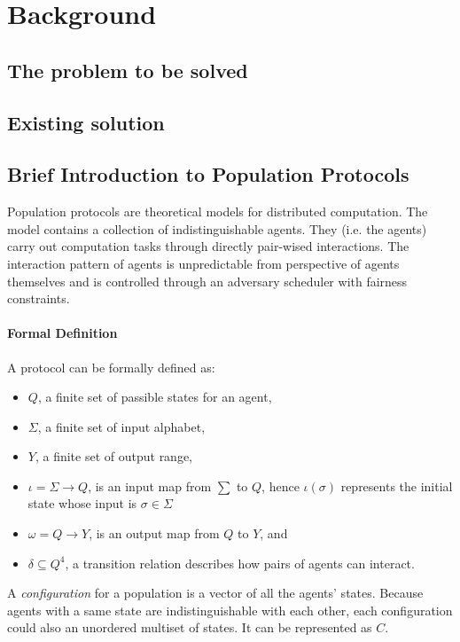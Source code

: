 \section{Background}
\subsection{The problem to be solved}

\subsection{Existing solution}

\subsection{Brief Introduction to Population Protocols \label{background} \cite{AspnesR2007, MCS11}}
\par\noindent
Population protocols are theoretical models for distributed computation.
The model contains a collection of indistinguishable agents.
They (i.e. the agents) carry out computation tasks through directly pair-wised interactions.
The interaction pattern of agents is unpredictable from perspective of agents themselves
and is controlled through an adversary scheduler with fairness constraints.
\paragraph{Formal Definition}
A protocol can be formally defined as:
\begin{itemize}
  \item $Q$, a finite set of passible states for an agent,
  \item $\Sigma$, a finite set of input alphabet,
  \item $Y$, a finite set of output range,
  \item $\iota = \Sigma \to Q $, is an input map from $\sum$ to $Q$, hence $\iota(\sigma)$ represents the initial state whose input is $\sigma \in \Sigma$
  \item $\omega = Q \to Y $, is an output map from $Q$ to $Y$, and
  \item $\delta \subseteq Q^{4}$, a transition relation describes how pairs of agents can interact.
\end{itemize}


\par\noindent
A \textit{configuration} for a population is a vector of all the agents' states.
Because agents with a same state are indistinguishable with each other, each configuration
could also an unordered multiset of states. It can be represented as $C$.


